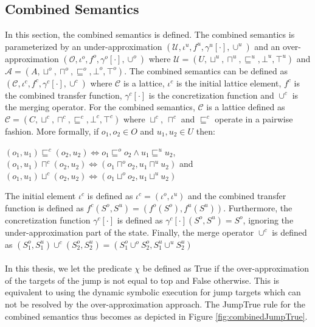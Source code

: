 \documentclass{kththesis}
\begin{document}
\subsection{Combined Semantics}
In this section, the combined semantics is defined. The combined semantics is parameterized by an under-approximation ${(\mathcal{U},\iota^{u},f^{u},\gamma^{u}[\cdot],\cup^{u})}$ and an over-approximation ${(\mathcal{O},\iota^{o},f^{o},\gamma^{o}[\cdot],\cup^{o})}$ where ${\mathcal{U}=(U,\sqcup^{u}, \sqcap^{u}, \sqsubseteq^{u}, \bot^{u}, \top^{u})}$ and ${\mathcal{A}=(A,\sqcup^{o}, \sqcap^{o}, \sqsubseteq^{o}, \bot^{o}, \top^{o})}$. The combined semantics can be defined as ${(\mathcal{C},\iota^{c},f^{c},\gamma^{c}[\cdot],\cup^{c})}$ where $\mathcal{C}$ is a lattice, $\iota^{c}$ is the initial lattice element, $f^{c}$ is the combined transfer function, $\gamma^{c}[\cdot]$ is the concretization function and $\cup^{c}$ is the merging operator. For the combined semantics, $\mathcal{C}$ is a lattice defined as $\mathcal{C}=(C,\sqcup^{c}, \sqcap^{c}, \sqsubseteq^{c}, \bot^{c}, \top^{c})$ where $\sqcup^{c}$, $\sqcap^{c}$ and $\sqsubseteq^{c}$ operate in a pairwise fashion. More formally, if $o_{1},o_{2}\in O$ and $u_{1},u_{2}\in U$ then:
\begin{center}
$(o_{1},u_{1})\sqsubseteq^{c}(o_{2},u_{2}) \Leftrightarrow o_{1}\sqsubseteq^{o}o_{2} \wedge u_{1}\sqsubseteq^{u}u_{2}$, \\
$(o_{1},u_{1})\sqcap^{c}(o_{2},u_{2}) \Leftrightarrow (o_{1}\sqcap^{o}o_{2}, u_{1}\sqcap^{u}u_{2})$ and \\
$(o_{1},u_{1})\sqcup^{c}(o_{2},u_{2}) \Leftrightarrow (o_{1}\sqcup^{o}o_{2}, u_{1}\sqcup^{u}u_{2})$
\end{center}
The initial element $\iota^{c}$ is defined as $\iota^{c}=(\iota^{o},\iota^{u})$ and the combined transfer function is defined as $f^{c}(S^o,S^u) = (f^{o}(S^o), f^{u}(S^u))$. Furthermore, the concretization function $\gamma^{c}[\cdot]$ is defined as $\gamma^{c}[\cdot](S^o,S^u) = S^o$, ignoring the under-approximation part of the state. Finally, the merge operator $\cup^{c}$ is defined as $(S^{o}_{1},S^{u}_{1})\cup^{c}(S^{o}_{2},S^{u}_{2}) = (S^{o}_{1} \cup^{o} S^{o}_{2},S^{u}_{1} \cup^{u} S^{u}_{2})$
\\ \\
In this thesis, we let the predicate $\chi$ be defined as True if the over-approximation of the targets of the jump is not equal to top and False otherwise. This is equivalent to using the dynamic symbolic execution for jump targets which can not be resolved by the over-approximation approach. The JumpTrue rule for the combined semantics thus becomes as depicted in Figure \ref{fig:combinedJumpTrue}.
\end{document}
